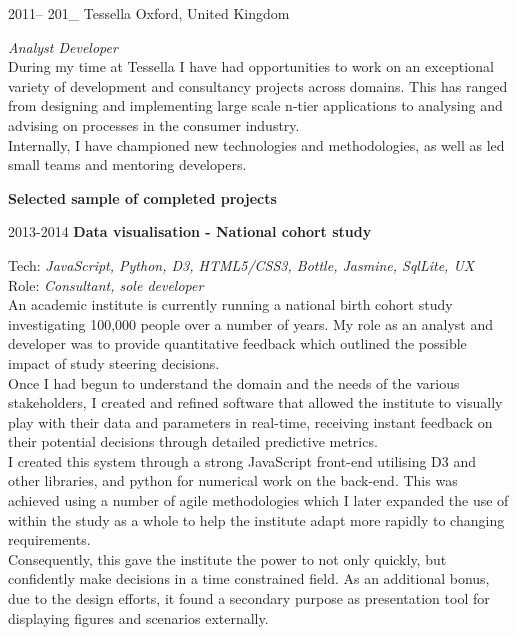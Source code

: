 \documentclass[]{friggeri-cv} %
\begin{document}
\begin{entrylist}
\entry
{2011-- 201\_ }
{\LARGE{Tessella}}
{Oxford, United Kingdom}
{\emph{Analyst Developer} \\
During my time at Tessella I have had opportunities to work on an exceptional variety of development and consultancy projects across domains. This has ranged from designing and implementing large scale n-tier applications to analysing and advising on processes in the consumer industry.\\
Internally, I have championed new technologies and methodologies, as well as led small teams and mentoring developers. \\
\centerline{\textbf{Selected sample of completed projects}}}

\entry
{2013-2014}
{\textbf{Data visualisation - National cohort study}}
{}
{Tech: \emph{JavaScript, Python, D3, HTML5/CSS3, Bottle, Jasmine, SqlLite, UX} \\
Role: \emph{Consultant, sole developer} \\
An academic institute is currently running a national birth cohort study investigating 100,000 people over a number of years. My role as an analyst and developer was to provide quantitative feedback which outlined the possible impact of study steering decisions. \\
Once I had begun to understand the domain and the needs of the various stakeholders, I created and refined software that allowed the institute to visually play with their data and parameters in real-time, receiving instant feedback on their potential decisions through detailed predictive metrics.\\
I created this system through a strong JavaScript front-end utilising D3 and other libraries, and python for numerical work on the back-end. This was achieved using a number of agile methodologies which I later expanded the use of within the study as a whole to help the institute adapt more rapidly to changing requirements. \\
Consequently, this gave the institute the power to not only quickly, but confidently make decisions in a time constrained field. As an additional bonus, due to the design efforts, it found a secondary purpose as presentation tool for displaying figures and scenarios externally.

}


\end{entrylist}
\end{document}
